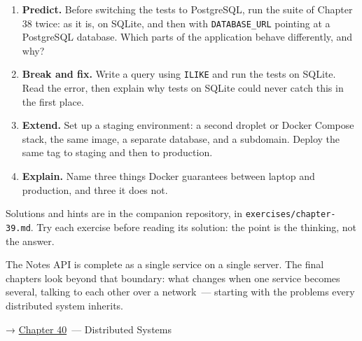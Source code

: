 \label{39-local-vs-production:exercises}

\begin{enumerate}
\def\labelenumi{\arabic{enumi}.}
\tightlist
\item
  \textbf{Predict.} Before switching the tests to PostgreSQL, run the suite of Chapter 38 twice: as it is, on SQLite, and then with \texttt{DATABASE\_URL} pointing at a PostgreSQL database. Which parts of the application behave differently, and why?
\item
  \textbf{Break and fix.} Write a query using \texttt{ILIKE} and run the tests on SQLite. Read the error, then explain why tests on SQLite could never catch this in the first place.
\item
  \textbf{Extend.} Set up a staging environment: a second droplet or Docker Compose stack, the same image, a separate database, and a subdomain. Deploy the same tag to staging and then to production.
\item
  \textbf{Explain.} Name three things Docker guarantees between laptop and production, and three it does not.
\end{enumerate}

\noindent{}Solutions and hints are in the companion repository, in \texttt{exercises/}\allowbreak{}\texttt{chapter-39.md}. Try each exercise before reading its solution: the point is the thinking, not the answer.

\label{39-local-vs-production:whats-next}

The Notes API is complete as a single service on a single server. The final chapters look beyond that boundary: what changes when one service becomes several, talking to each other over a network~--- starting with the problems every distributed system inherits.

\noindent{}→ \hyperref[ch:40-distributed-systems]{Chapter 40}~--- Distributed Systems
